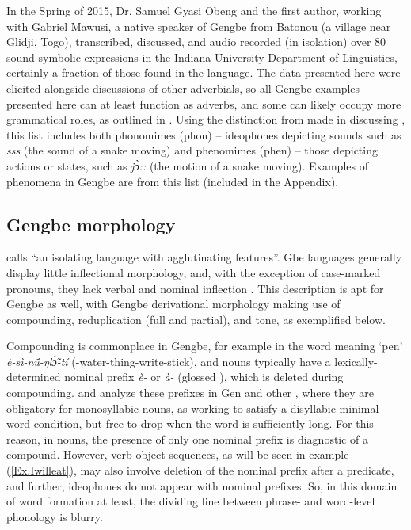 \documentclass[output=paper,colorlinks,citecolor=brown]{langscibook}
\begin{document}
In the Spring of 2015, Dr. Samuel Gyasi Obeng and the first author, working with Gabriel Mawusi, a native speaker of Gengbe from Batonou (a village near Glidji, Togo), transcribed, discussed, and audio recorded (in isolation) over 80 sound symbolic expressions in the Indiana University Department of Linguistics, certainly a fraction of those found in the language. The data presented here were elicited alongside discussions of other adverbials, so all Gengbe examples presented here can at least function as adverbs, and some can likely occupy more grammatical roles, as outlined in \citet{Ameka2001}. Using the distinction from \citet{Martin1975} made in discussing , this list includes both phonomimes (phon) -- ideophones depicting sounds such as \textit{sss} (the sound of a snake moving) and phenomimes (phen) -- those depicting actions or states, such as \textit{jɔ̀::} (the motion of a snake moving). Examples of phenomena in Gengbe are from this list (included in the Appendix). 

\subsection{Gengbe morphology}
\label{Gengbe Morphology}

\citet[1]{Essegbey2006} calls  “an isolating language with agglutinating features”. Gbe languages generally display little inflectional morphology, and, with the exception of case-marked pronouns, they lack verbal and nominal inflection \citep[32--33] {Aboh2004}. This description is apt for Gengbe as well, with Gengbe derivational morphology making use of compounding, reduplication (full and partial), and tone, as exemplified below.

Compounding is commonplace in Gengbe, for example in the word meaning ‘pen’ \textit{è-sì-nṹ-ŋlɔ̃̀-tí} (-water-thing-write-stick), and nouns typically have a lexically-determined nominal prefix \textit{è-} or \textit{à-} (glossed ), which is deleted during compounding. \citet{Abaglo&Archangeli1989} and \citet{Beavon-Hamm2020} analyze these prefixes in Gen and other , where they are obligatory for monosyllabic nouns, as working to satisfy a disyllabic minimal word condition, but free to drop when the word is sufficiently long. For this reason, in nouns, the presence of only one nominal prefix is diagnostic of a compound. However, verb-object sequences, as will be seen in example (\ref{Ex.Iwilleat}), may also involve deletion of the nominal prefix after a predicate, and further, ideophones do not appear with nominal prefixes. So, in this domain of word formation at least, the dividing line between phrase- and word-level phonology is blurry. 
\end{document}
